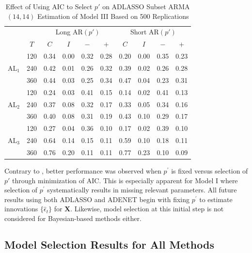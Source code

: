\begin{table}[htbp]
\caption{Effect of Using AIC to Select $p'$ on ADLASSO Subset ARMA$(14,14)$ Estimation of Model III Based on 500 Replications}
\centering
\begin{tabular}{cc|cccc|cccc}
  \hline
    & & \multicolumn{4}{c|}{Long AR$(p')$} & \multicolumn{4}{c}{Short AR$(p')$} \\
      \cline{4-5}  \cline{8-9}
  & $T$ & $C$ & $I$ & $-$ & $+$ & $C$ & $I$ & $-$ & $+$\\
  \hline
  \multirow{3}{*}{$\textrm{AL}_1$} & 120 & 0.34 & 0.00 & 0.32 & 0.28 & 0.20 & 0.00 & 0.35 & 0.23 \\ 
  & 240 & 0.42 & 0.01 & 0.26 & 0.32 & 0.39 & 0.02 & 0.26 & 0.28 \\ 
  & 360 & 0.44 & 0.03 & 0.25 & 0.34 & 0.47 & 0.04 & 0.23 & 0.31 \\ 
    \hline
  \multirow{3}{*}{$\textrm{AL}_2$} & 120 & 0.24 & 0.03 & 0.41 & 0.15 & 0.14 & 0.02 & 0.41 & 0.13 \\ 
  & 240 & 0.37 & 0.08 & 0.32 & 0.17 & 0.33 & 0.05 & 0.34 & 0.16 \\ 
  & 360 & 0.40 & 0.08 & 0.31 & 0.19 & 0.43 & 0.10 & 0.29 & 0.17 \\ 
    \hline
  \multirow{3}{*}{$\textrm{AL}_3$} & 120 & 0.27 & 0.04 & 0.36 & 0.10 & 0.17 & 0.02 & 0.39 & 0.10 \\ 
  & 240 & 0.64 & 0.14 & 0.15 & 0.11 & 0.59 & 0.10 & 0.18 & 0.11 \\ 
  & 360 & 0.76 & 0.20 & 0.11 & 0.11 & 0.77 & 0.23 & 0.10 & 0.09 \\ 
   \hline
\end{tabular}
\label{tab:longvsshort3}
\end{table}

Contrary to \cite{Chen2011}, better performance was observed when $p^\prime$ is fixed versus selection of $p'$ through minimization of AIC. This is especially apparent for Model I where selection of $p^\prime$ systematically results in missing relevant parameters. All future results using both ADLASSO and ADENET begin with fixing $p^\prime$ to estimate innovations $\{\hat{\epsilon}_t\}$ for $\bm{X}$. Likewise, model selection at this initial step is not considered for Bayesian-based methods either.

\subsection{Model Selection Results for All Methods}

